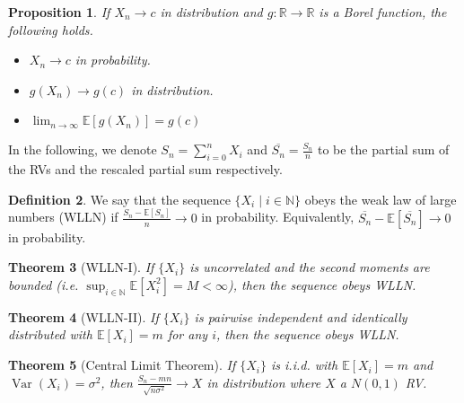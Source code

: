 \documentclass[paper=a4, fontsize=12pt]{scrartcl} %
\newtheorem{thm}{Theorem}[section]
\newtheorem{prop}[thm]{Proposition}
\theoremstyle{definition}
\newtheorem{defn}[thm]{Definition}
\theoremstyle{remark}
\newcommand{\R}{\mathbb{R}}
\newcommand{\N}{\mathbb{N}}
\newcommand{\E}{\mathbb{E}}
\DeclareMathOperator{\vari}{Var}
\numberwithin{equation}{section} %
\numberwithin{figure}{section} %
\numberwithin{table}{section} %
\begin{document}
\begin{prop}
	If $X_n \rightarrow c$ in distribution and $g: \R \rightarrow \R$ is a Borel function, the following holds.
	\begin{itemize}
		\item $X_n \rightarrow c$ in probability.
		\item $g(X_n) \rightarrow g(c)$ in distribution.
		\item $\lim_{n\rightarrow \infty} \E[g(X_n)] = g(c)$
	\end{itemize}
\end{prop}
In the following, we denote $S_n = \sum_{i=0}^n X_i$ and $\overline{S_n} = \frac{S_n}{n}$ to be the partial sum of the RVs and the rescaled partial sum respectively.
\begin{defn}
	We say that the sequence $\{X_i \mid i \in \N\}$ obeys the weak law of large numbers (WLLN) if $\frac{S_n -\E[S_n]}{n} \rightarrow 0$ in probability. Equivalently, $\overline{S_n} - \E[\overline{S_n}] \rightarrow 0$ in probability.
\end{defn}
\begin{thm}[WLLN-I]
	If $\{X_i\}$ is uncorrelated and the second moments are bounded (i.e. $\sup_{i \in \N}\E[X_i^2] = M < \infty$), then the sequence obeys WLLN.
\end{thm}
\begin{thm}[WLLN-II]
	If $\{X_i\}$ is pairwise independent and identically distributed with $\E[X_i] = m$ for any $i$, then the sequence obeys WLLN.
\end{thm}
\begin{thm}[Central Limit Theorem]
	If $\{X_i\}$ is i.i.d. with $\E[X_i] = m$ and $\vari(X_i) = \sigma^2$, then $\frac{S_n -mn}{\sqrt{n\sigma^2}} \rightarrow X$ in distribution where $X$ a $N(0,1)$ RV.
\end{thm}
\end{document}
